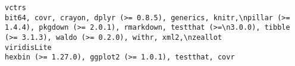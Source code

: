 \documentclass[
  letterpaper,
  DIV=11,
  numbers=noendperiod]{scrreprt}
\begin{document}
\begin{verbatim}
vctrs                                                                                                                                                                                                                                                                                                                                                                                                                                                                                                                                                                                                                                                                                                                                                                                                                                                                                                                                                                                                                                                                                                             bit64, covr, crayon, dplyr (>= 0.8.5), generics, knitr,\npillar (>= 1.4.4), pkgdown (>= 2.0.1), rmarkdown, testthat (>=\n3.0.0), tibble (>= 3.1.3), waldo (>= 0.2.0), withr, xml2,\nzeallot
viridisLite                                                                                                                                                                                                                                                                                                                                                                                                                                                                                                                                                                                                                                                                                                                                                                                                                                                                                                                                                                                                                                                                                                                                                                                                                                            hexbin (>= 1.27.0), ggplot2 (>= 1.0.1), testthat, covr

\end{verbatim}
\end{document}
